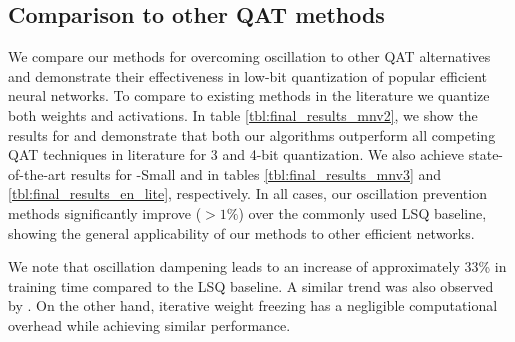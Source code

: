 

\subsection{Comparison to other QAT methods}
\label{sec:comparison_to_qat_methods}
We compare our methods for overcoming oscillation  to other QAT alternatives and demonstrate their effectiveness in low-bit quantization of popular efficient neural networks. To compare to existing methods in the literature we quantize both weights and activations. 
In table \ref{tbl:final_results_mnv2}, we show the results for  and demonstrate that both our algorithms outperform all competing QAT techniques in literature for 3 and 4-bit quantization. We also achieve state-of-the-art results for -Small and  in tables \ref{tbl:final_results_mnv3} and \ref{tbl:final_results_en_lite}, respectively. In all cases, our oscillation prevention methods significantly improve ($>1\%$) over the commonly used LSQ baseline, showing the general applicability of our methods to other efficient networks.

We note that oscillation dampening leads to an increase of approximately 33\% in training time compared to the LSQ baseline. A similar trend was also observed by \cite{binreg}. On the other hand, iterative weight freezing has a negligible computational overhead while achieving similar performance.
